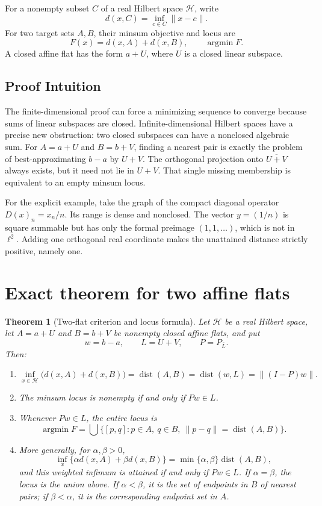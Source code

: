\documentclass[11pt]{article}
\newtheorem{theorem}{Theorem}
\newcommand{\Hsp}{\mathcal H}
\newcommand{\Argmin}{\operatorname*{argmin}}
\newcommand{\dist}{\operatorname{dist}}
\begin{document}
For a nonempty subset $C$ of a real Hilbert space $\Hsp$, write
\[
 d(x,C)=\inf_{c\in C}\|x-c\|.
\]
For two target sets $A,B$, their minsum objective and locus are
\[
 F(x)=d(x,A)+d(x,B),\qquad \Argmin F.
\]
A closed affine flat has the form $a+U$, where $U$ is a closed linear
subspace.

\subsection*{Proof Intuition}

The finite-dimensional proof can force a minimizing sequence to converge
because sums of linear subspaces are closed.  Infinite-dimensional Hilbert
spaces have a precise new obstruction: two closed subspaces can have a
nonclosed algebraic sum.  For $A=a+U$ and $B=b+V$, finding a nearest pair is
exactly the problem of best-approximating $b-a$ by $U+V$.  The orthogonal
projection onto $\overline{U+V}$ always exists, but it need not lie in $U+V$.
That single missing membership is equivalent to an empty minsum locus.

For the explicit example, take the graph of the compact diagonal operator
$D(x)_n=x_n/n$.  Its range is dense and nonclosed.  The vector
$y=(1/n)$ is square summable but has only the formal preimage $(1,1,\ldots)$,
which is not in $\ell^2$.  Adding one orthogonal real coordinate makes the
unattained distance strictly positive, namely one.

\section{Exact theorem for two affine flats}

\begin{theorem}[Two-flat criterion and locus formula]\label{thm:criterion}
Let $\Hsp$ be a real Hilbert space, let $A=a+U$ and $B=b+V$ be nonempty
closed affine flats, and put
\[
 w=b-a,\qquad L=U+V,\qquad P=P_{\overline L}.
\]
Then:
\begin{enumerate}[label=\textup{(\roman*)}]
\item
\[
 \inf_{x\in\Hsp}\bigl(d(x,A)+d(x,B)\bigr)
 =\dist(A,B)=\dist(w,L)=\|(I-P)w\|.
\]
\item The minsum locus is nonempty if and only if $Pw\in L$.
\item Whenever $Pw\in L$, the entire locus is
\[
 \Argmin F
 =\bigcup\bigl\{[p,q]:p\in A,\ q\in B,\
                 \|p-q\|=\dist(A,B)\bigr\}.
\]
\item More generally, for $\alpha,\beta>0$,
\[
 \inf_x\{\alpha d(x,A)+\beta d(x,B)\}
 =\min\{\alpha,\beta\}\dist(A,B),
\]
and this weighted infimum is attained if and only if $Pw\in L$.
If $\alpha=\beta$, the locus is the union above.  If $\alpha<\beta$, it is
the set of endpoints in $B$ of nearest pairs; if $\beta<\alpha$, it is the
corresponding endpoint set in $A$.
\end{enumerate}
\end{theorem}
\end{document}
